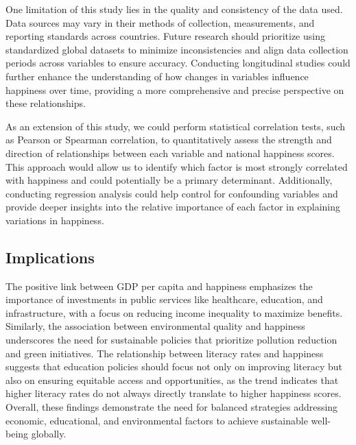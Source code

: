\documentclass[
]{article}
\begin{document}
One limitation of this study lies in the quality and consistency of the
data used. Data sources may vary in their methods of collection,
measurements, and reporting standards across countries. Future research
should prioritize using standardized global datasets to minimize
inconsistencies and align data collection periods across variables to
ensure accuracy. Conducting longitudinal studies could further enhance
the understanding of how changes in variables influence happiness over
time, providing a more comprehensive and precise perspective on these
relationships.

As an extension of this study, we could perform statistical correlation
tests, such as Pearson or Spearman correlation, to quantitatively assess
the strength and direction of relationships between each variable and
national happiness scores. This approach would allow us to identify
which factor is most strongly correlated with happiness and could
potentially be a primary determinant. Additionally, conducting
regression analysis could help control for confounding variables and
provide deeper insights into the relative importance of each factor in
explaining variations in happiness.

\subsection{Implications}\label{implications}

The positive link between GDP per capita and happiness emphasizes the
importance of investments in public services like healthcare, education,
and infrastructure, with a focus on reducing income inequality to
maximize benefits. Similarly, the association between environmental
quality and happiness underscores the need for sustainable policies that
prioritize pollution reduction and green initiatives. The relationship
between literacy rates and happiness suggests that education policies
should focus not only on improving literacy but also on ensuring
equitable access and opportunities, as the trend indicates that higher
literacy rates do not always directly translate to higher happiness
scores. Overall, these findings demonstrate the need for balanced
strategies addressing economic, educational, and environmental factors
to achieve sustainable well-being globally.
\end{document}
